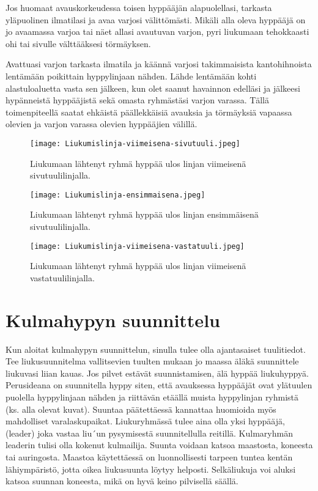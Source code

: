 Jos huomaat avauskorkeudessa toisen hyppääjän alapuolellasi, tarkasta yläpuolinen ilmatilasi ja avaa varjosi välittömästi. Mikäli alla oleva hyppääjä on jo avaamassa varjoa tai näet allasi avautuvan varjon, pyri liukumaan tehokkaasti ohi tai sivulle välttääksesi törmäyksen. 


Avattuasi varjon tarkasta ilmatila ja käännä varjosi takimmaisista kantohihnoista lentämään poikittain hyppylinjaan nähden. Lähde lentämään kohti alastuloaluetta vasta sen jälkeen, kun olet saanut havainnon edelläsi ja jälkeesi hypänneistä hyppääjistä sekä omasta ryhmästäsi varjon varassa. Tällä toimenpiteellä saatat ehkäistä päällekkäisiä avauksia ja törmäyksiä vapaassa olevien ja varjon varassa olevien hyppääjien välillä. 


\begin{figure*}[]\centering\texttt{[image: Liukumislinja-viimeisena-sivutuuli.jpeg]}\caption{Liukumaan lähtenyt ryhmä hyppää ulos linjan viimeisenä sivutuulilinjalla.}\end{figure*} \begin{figure*}[]\centering\texttt{[image: Liukumislinja-ensimmaisena.jpeg]}\caption{Liukumaan lähtenyt ryhmä hyppää ulos linjan ensimmäisenä sivutuulilinjalla.}\end{figure*} \begin{figure*}[]\centering\texttt{[image: Liukumislinja-viimeisena-vastatuuli.jpeg]}\caption{Liukumaan lähtenyt ryhmä hyppää ulos linjan viimeisenä vastatuulilinjalla.}\end{figure*} 

\section{ Kulmahypyn suunnittelu }
\label{turvallisuus-freehyppaamisessa-kulmahypyn-suunnittelu}


Kun aloitat kulmahypyn suunnittelun, sinulla tulee olla ajantasaiset tuulitiedot. Tee liukusuunnitelma vallitsevien tuulten mukaan jo maassa äläkä suunnittele liukuvasi liian kauas. Jos pilvet estävät suunnistamisen, älä hyppää liukuhyppyä. Perusideana on suunnitella hyppy siten, että avauksessa hyppääjät ovat ylätuulen puolella hyppylinjaan nähden ja riittävän etäällä muista hyppylinjan ryhmistä (ks. alla olevat kuvat). Suuntaa päätettäessä kannattaa huomioida myös mahdolliset varalaskupaikat. Liukuryhmässä tulee aina olla yksi hyppääjä, (leader) joka vastaa liu´un pysymisestä suunnitellulla reitillä. Kulmaryhmän leaderin tulisi olla kokenut kulmailija. Suunta voidaan katsoa maastosta, koneesta tai auringosta. Maastoa käytettäessä on luonnollisesti tarpeen tuntea kentän lähiympäristö, jotta oikea liukusuunta löytyy helposti. Selkäliukuja voi aluksi katsoa suunnan koneesta, mikä on hyvä keino pilvisellä säällä. 


